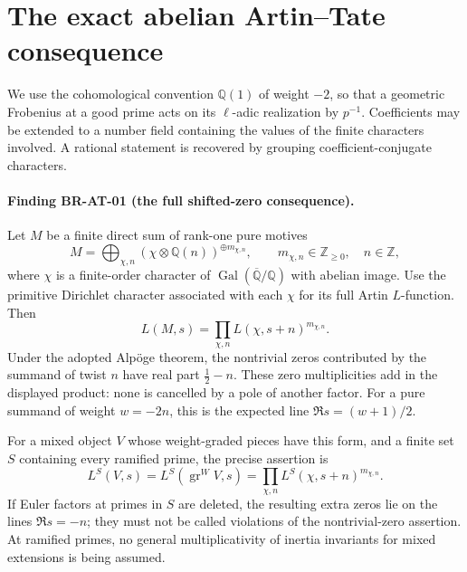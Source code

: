 \section{The exact abelian Artin--Tate consequence}
\label{sec:root-artin-tate}

We use the cohomological convention $\mathbb Q(1)$ of weight $-2$,
so that a geometric Frobenius at a good prime acts on its $\ell$-adic
realization by $p^{-1}$.  Coefficients may be extended to a number field
containing the values of the finite characters involved.  A rational
statement is recovered by grouping coefficient-conjugate characters.

\paragraph{Finding BR-AT-01 (the full shifted-zero consequence).}
Let $M$ be a finite direct sum of rank-one pure motives
\[
 M=\bigoplus_{\chi,n} (\chi\otimes\mathbb Q(n))^{\oplus m_{\chi,n}},
 \qquad m_{\chi,n}\in\mathbb Z_{\geq0},\quad n\in\mathbb Z,
\]
where $\chi$ is a finite-order character of
$\operatorname{Gal}(\overline{\mathbb Q}/\mathbb Q)$ with abelian image.
Use the primitive Dirichlet character associated with each $\chi$ for
its full Artin $L$-function.  Then
\[
 L(M,s)=\prod_{\chi,n}L(\chi,s+n)^{m_{\chi,n}}.
\]
Under the adopted Alp\"oge theorem, the nontrivial zeros contributed by
the summand of twist $n$ have real part $\tfrac12-n$.
These zero multiplicities add in the displayed product: none is cancelled
by a pole of another factor.  For a pure summand of weight $w=-2n$, this
is the expected line $\Re s=(w+1)/2$.

For a mixed object $V$ whose weight-graded pieces have this form, and a
finite set $S$ containing every ramified prime, the precise assertion is
\[
 L^S(V,s)=L^S(\operatorname{gr}^W V,s)
 =\prod_{\chi,n}L^S(\chi,s+n)^{m_{\chi,n}}.
\]
If Euler factors at primes in $S$ are deleted, the resulting extra zeros
lie on the lines $\Re s=-n$; they must not be called violations of the
nontrivial-zero assertion.  At ramified primes, no general multiplicativity
of inertia invariants for mixed extensions is being assumed.

